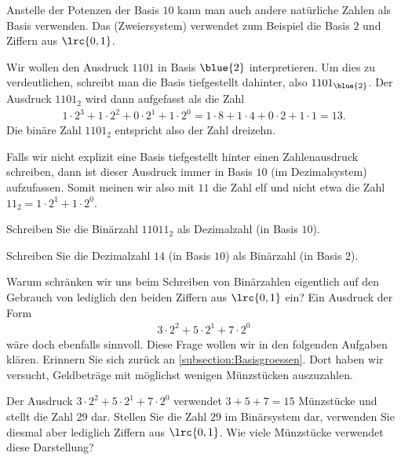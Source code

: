 Anstelle der Potenzen der Basis $10$ kann man auch andere natürliche Zahlen als Basis verwenden. 
Das  (Zweiersystem) verwendet zum Beispiel die Basis $2$ und
Ziffern aus $\lrc{0,1}$. 
\begin{myexample}
  Wir wollen den Ausdruck $1101$ in Basis $\blue{2}$ interpretieren. Um dies zu verdeutlichen, schreibt man die Basis
  tiefgestellt dahinter, also $1101_{\blue{2}}$. Der Ausdruck $1101_2$ wird dann aufgefasst als die Zahl
  \begin{align*}
    1\cdot 2^3 + 1\cdot 2^2 + 0\cdot 2^1 + 1\cdot 2^0 = 1\cdot 8 + 1\cdot 4 + 0\cdot 2 + 1\cdot 1 = 13.
  \end{align*}
  Die binäre Zahl $1101_2$ entspricht also der Zahl dreizehn.
\end{myexample}

\begin{mycaution}
  Falls wir nicht explizit eine Basis tiefgestellt hinter einen Zahlenausdruck schreiben, dann ist dieser Ausdruck immer in Basis $10$ (im
  Dezimalsystem) aufzufassen. Somit meinen wir also mit $11$ die Zahl elf und nicht etwa die Zahl $11_2 = 1\cdot 2^1 +
  1\cdot 2^0$.
\end{mycaution}

\begin{myexercise}
  Schreiben Sie die Binärzahl $11011_2$ als Dezimalzahl (in Basis $10$).
\end{myexercise}

\begin{myexercise}
  Schreiben Sie die Dezimalzahl $14$ (in Basis $10$) als Binärzahl (in Basis $2$).
\end{myexercise}

Warum schränken wir uns beim Schreiben von Binärzahlen eigentlich auf den Gebrauch von lediglich den beiden Ziffern aus
$\lrc{0,1}$ ein? Ein Ausdruck der Form
\begin{align*}
  3\cdot 2^2 + 5\cdot 2^1 + 7\cdot 2^0
\end{align*}
wäre doch ebenfalls sinnvoll. Diese Frage wollen wir in den folgenden Aufgaben klären. Erinnern Sie sich zurück an \cref{subsection:Basisgroessen}. 
Dort haben wir versucht, Geldbeträge mit möglichst wenigen Münzstücken auszuzahlen. 

\begin{myexercise}
  Der Ausdruck $3\cdot 2^2 + 5\cdot 2^1 + 7\cdot 2^0$ verwendet $3+5+7 = 15$ Münzstücke und stellt die Zahl $29$ dar.
  Stellen Sie die Zahl $29$ im Binärsystem dar, verwenden Sie diesmal aber lediglich Ziffern aus $\lrc{0,1}$. Wie viele
  Münzstücke verwendet diese Darstellung?
\end{myexercise}

